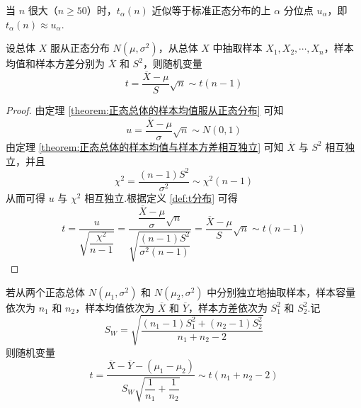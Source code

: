当 $n$ 很大（$n \geqslant 50$）时，$t_{\alpha}(n)$ 近似等于标准正态分布的上 $\alpha$ 分位点 $u_{\alpha}$，即 $t_{\alpha}(n) \approx u_{\alpha}$.

\begin{theorem}
    设总体 $X$ 服从正态分布 $N(\mu,\sigma^2)$，从总体 $X$ 中抽取样本 $X_1,X_2,\cdots,X_n$，样本均值和样本方差分别为 $\overline{X}$ 和 $S^2$，则随机变量
    $$
    t = \dfrac{\overline{X} - \mu}{S} \sqrt{n} \sim t(n-1)
    $$
\end{theorem}

\begin{proof}
    由定理 \ref{theorem:正态总体的样本均值服从正态分布} 可知
    $$
    u = \dfrac{\overline{X} - \mu}{\sigma} \sqrt{n} \sim N(0,1)
    $$
    由定理 \ref{theorem:正态总体的样本均值与样本方差相互独立} 可知 $\overline{X}$ 与 $S^2$ 相互独立，并且
    $$
    \chi^2 = \dfrac{(n-1) S^2}{\sigma^2} \sim \chi^2(n-1)
    $$
    从而可得 $u$ 与 $\chi^2$ 相互独立.根据定义 \ref{def:t分布} 可得
    $$
    t = \dfrac{u}{\sqrt{\dfrac{\chi^2}{n-1}}} = \dfrac{\dfrac{\overline{X} - \mu}{\sigma} \sqrt{n}}{\sqrt{\dfrac{(n-1) S^2}{\sigma^2 (n-1)}}} = \dfrac{\overline{X} - \mu}{S} \sqrt{n} \sim t(n-1)
    $$
\end{proof}

\begin{theorem}
    若从两个正态总体 $N(\mu_1, \sigma^2)$ 和 $N(\mu_2, \sigma^2)$ 中分别独立地抽取样本，样本容量依次为 $n_1$ 和 $n_2$，样本均值依次为 $\overline{X}$ 和 $\overline{Y}$，样本方差依次为 $S_1^2$ 和 $S_2^2$.记
    $$
    S_W = \sqrt{\dfrac{(n_1 - 1) S_1^2 + (n_2 - 1) S_2^2}{n_1 + n_2 - 2}}
    $$
    则随机变量
    $$
    t = \dfrac{\overline{X} - \overline{Y} - (\mu_1 - \mu_2)}{S_W \sqrt{\dfrac{1}{n_1} + \dfrac{1}{n_2}}} \sim t(n_1 + n_2 - 2)
    $$
\end{theorem}

